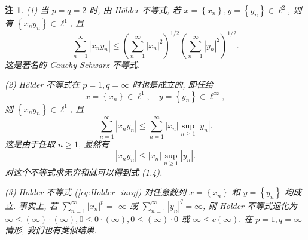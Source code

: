 \documentclass[openany]{ctexbook}
\theoremstyle{kaiti}
\theoremstyle{normal}
\newtheorem{remark}{注}[section]
\begin{document}
\begin{remark}
(1) 当 $p=q=2$ 时, 由 Hölder 不等式, 若 $x=\left\{x_n\right\}, y=\left\{y_n\right\} \in \ell^2$, 则有 $\left\{x_n y_n\right\} \in \ell^1$, 且
\begin{equation}
  \label{eq:Cauchy_Schwarz_ineq}
  \sum_{n=1}^{\infty}\left|x_n y_n\right| \leqslant\left(\sum_{n=1}^{\infty}\left|x_n\right|^2\right)^{1 / 2}\left(\sum_{n=1}^{\infty}\left|y_n\right|^2\right)^{1 / 2}.
\end{equation}
这是著名的 Cauchy-Schwarz 不等式.

(2) Hölder 不等式在 $p=1, q=\infty$ 时也是成立的, 即任给
$$
x=\left\{x_n\right\} \in \ell^1, \quad y=\left\{y_n\right\} \in \ell^{\infty},
$$
则 $\left\{x_n y_n\right\} \in \ell^1$, 且
\begin{equation}
  \sum_{n=1}^{\infty}\left|x_n y_n\right| \leqslant \sum_{n=1}^{\infty}\left|x_n\right| \sup_{n \geqslant 1}\left|y_n\right|.
\end{equation}
这是由于任取 $n \geqslant 1$, 显然有
$$
\left|x_n y_n\right| \leqslant\left|x_n\right| \sup_{n \geqslant 1}\left|y_n\right|.
$$
对这个不等式求无穷和就可以得到式 (1.4).

(3) Hölder 不等式 (\ref{eq:Holder_ineq}) 对任意数列 $x=\left\{x_n\right\}$ 和 $y=\left\{y_n\right\}$ 均成立. 事实上, 若 $\sum_{n=1}^{\infty}\left|x_n\right|^{p}=$ $\infty$ 或 $\sum_{n=1}^{\infty}\left|y_n\right|^{q}=\infty$, 则 Hölder 不等式退化为 $\infty \leqslant(\infty) \cdot(\infty), 0 \leqslant 0 \cdot(\infty), 0 \leqslant(\infty) \cdot 0$ 或 $\infty \leqslant c(\infty).$ 在 $p=1, q=\infty$ 情形, 我们也有类似结果.
\end{remark}
\end{document}

